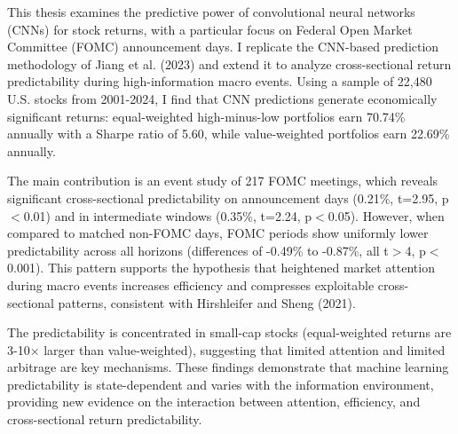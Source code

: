 
This thesis examines the predictive power of convolutional neural networks (CNNs) for stock returns, with a particular focus on Federal Open Market Committee (FOMC) announcement days. I replicate the CNN-based prediction methodology of Jiang et al. (2023) and extend it to analyze cross-sectional return predictability during high-information macro events. Using a sample of 22,480 U.S. stocks from 2001-2024, I find that CNN predictions generate economically significant returns: equal-weighted high-minus-low portfolios earn 70.74\% annually with a Sharpe ratio of 5.60, while value-weighted portfolios earn 22.69\% annually. 

The main contribution is an event study of 217 FOMC meetings, which reveals significant cross-sectional predictability on announcement days (0.21\%, t=2.95, p$<$0.01) and in intermediate windows (0.35\%, t=2.24, p$<$0.05). However, when compared to matched non-FOMC days, FOMC periods show uniformly lower predictability across all horizons (differences of -0.49\% to -0.87\%, all t$>$4, p$<$0.001). This pattern supports the hypothesis that heightened market attention during macro events increases efficiency and compresses exploitable cross-sectional patterns, consistent with Hirshleifer and Sheng (2021). 

The predictability is concentrated in small-cap stocks (equal-weighted returns are 3-10× larger than value-weighted), suggesting that limited attention and limited arbitrage are key mechanisms. These findings demonstrate that machine learning predictability is state-dependent and varies with the information environment, providing new evidence on the interaction between attention, efficiency, and cross-sectional return predictability.

